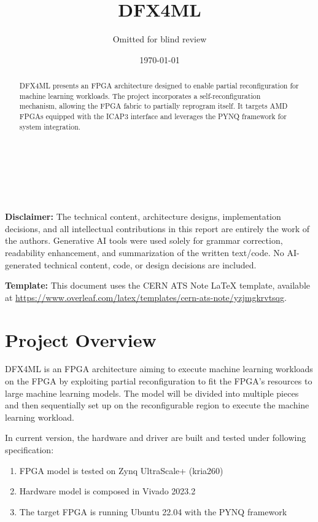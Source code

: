\documentclass{cernatsnote}
\title{DFX4ML}
\author{
	Omitted for blind review
}
\date{\today}
\begin{document}
\maketitle

\begin{abstract}
DFX4ML presents an FPGA architecture designed to enable partial reconfiguration for machine learning workloads. The project incorporates a self-reconfiguration mechanism, allowing the FPGA fabric to partially reprogram itself. It targets AMD FPGAs equipped with the ICAP3 interface and leverages the PYNQ framework for system integration.
\end{abstract}
\\ \\ \\

\begin{small}
\noindent\textbf{Disclaimer:} The technical content, architecture designs, implementation decisions, and all intellectual contributions in this report are entirely the work of the authors. Generative AI tools were used solely for grammar correction, readability enhancement, and summarization of the written text/code. No AI-generated technical content, code, or design decisions are included.

\medskip
\noindent\textbf{Template:} This document uses the CERN ATS Note \LaTeX{} template, available at \url{https://www.overleaf.com/latex/templates/cern-ats-note/yzjmgkrvtsqg}.
\end{small}

\bigskip

\begingroup
\color{black}
\tableofcontents
\endgroup

\pagebreak

\section{Project Overview}

DFX4ML is an FPGA architecture aiming to execute machine learning workloads on the FPGA by exploiting partial reconfiguration to fit the FPGA's resources to large machine learning models.
The model will be divided into multiple pieces and then sequentially set up on the reconfigurable region to execute the machine learning workload.

In current version, the hardware and driver are built and tested under following specification:

\begin{enumerate}
  \item FPGA model is tested on Zynq UltraScale+ (kria260)
  \item Hardware model is composed in Vivado 2023.2
  \item The target FPGA is running Ubuntu 22.04 with the PYNQ framework
\end{enumerate}
\end{document}
